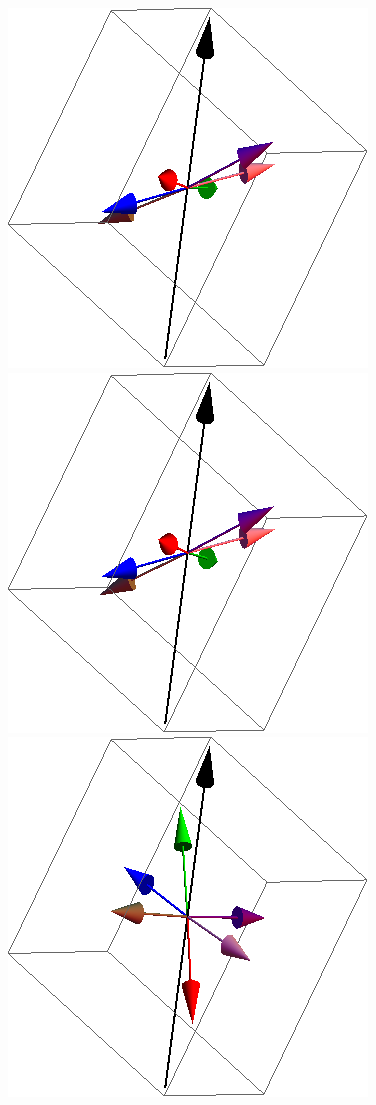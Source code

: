 \documentclass{article}
\begin{document}
\begin{figure}[ht]
\centering
\includegraphics[scale=0.27]{111_2000/1S005to000R.png}
\includegraphics[scale=0.27]{111_2000/2S005to000R.png}
\includegraphics[scale=0.27]{111_2000/3S005to000R.png}

\end{figure}
\end{document}
